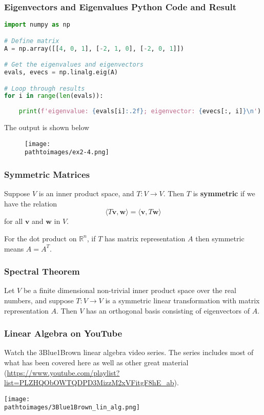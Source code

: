 \documentclass{beamer}
\newcommand{\pathtoimages}{/Users/charlesrambo/Desktop/Bootcamp24/Images}
\begin{document}
\begin{frame}[fragile]
\frametitle{Eigenvectors and Eigenvalues Python Code and Result}

\begin{lstlisting}[language=Python]
import numpy as np

# Define matrix 
A = np.array([[4, 0, 1], [-2, 1, 0], [-2, 0, 1]])

# Get the eigenvalues and eigenvectors
evals, evecs = np.linalg.eig(A)

# Loop through results
for i in range(len(evals)):
    
    print(f'eigenvalue: {evals[i]:.2f}; eigenvector: {evecs[:, i]}\n')
 \end{lstlisting}

The output is shown below
\begin{figure}
\centering
\texttt{[image: \\pathtoimages/ex2-4.png]}
\end{figure}
\end{frame}

\begin{frame}
\frametitle{Symmetric Matrices}
\begin{Definition}
Suppose $V$ is an inner product space, and $T:V\to V$. Then $T$ is {\bf symmetric} if we have the relation
$$
\langle T{\boldsymbol v}, {\boldsymbol w}\rangle = \langle {\boldsymbol v}, T{\boldsymbol w}\rangle
$$
for all ${\boldsymbol v}$ and ${\boldsymbol w}$ in $V$. 
\end{Definition}
For the dot product on $\mathbb{R}^n$, if $T$ has matrix representation $A$ then symmetric means $A = A^T$.
\end{frame}

\begin{frame}
\frametitle{Spectral Theorem}

\begin{Theorem}
Let $V$ be a finite dimensional non-trivial inner product space over the real numbers, and suppose $T:V\to V$ is a symmetric linear transformation with matrix representation $A$. Then $V$ has an orthogonal basis consisting of eigenvectors of $A$.
\end{Theorem}


\end{frame}

\begin{frame}
\frametitle{Linear Algebra on YouTube}
\small
Watch the 3Blue1Brown linear algebra video series. The series includes most of what has been covered here as well as other great material ({\small \url{https://www.youtube.com/playlist?list=PLZHQObOWTQDPD3MizzM2xVFitgF8hE_ab}}).
\begin{center}
\texttt{[image: \\pathtoimages/3Blue1Brown\_lin\_alg.png]}
\end{center}
\end{frame}
\end{document}
